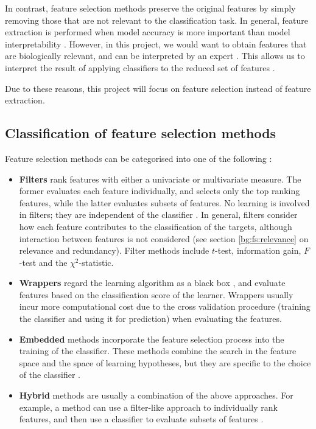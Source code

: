 \documentclass[12pt, twoside, a4paper]{report}
\begin{document}
In contrast, feature selection methods preserve the original features by simply removing those that are not relevant to the classification task. In general, feature extraction is performed when model accuracy is more important than model interpretability \cite{RefWorks:163}. However, in this project, we would want to obtain features that are biologically relevant, and can be interpreted by an expert \cite{RefWorks:192}. This allows us to interpret the result of applying classifiers to the reduced set of features \cite{RefWorks:142}.

Due to these reasons, this project will focus on feature selection instead of feature extraction.

\subsection{Classification of feature selection methods} \label{bg:fs:classification}

Feature selection methods can be categorised into one of the following \cite{RefWorks:117, RefWorks:118}:

\begin{itemize}
\item \textbf{Filters} rank features with either a univariate or multivariate measure. The former evaluates each feature individually, and selects only the top ranking features, while the latter evaluates subsets of features. No learning is involved in filters; they are independent of the classifier \cite{RefWorks:216}. In general, filters consider how each feature contributes to the classification of the targets, although interaction between features is not considered \cite{RefWorks:232} (see section \ref{bg:fs:relevance} on relevance and redundancy). Filter methods include $t$-test, information gain, $F$-test and the $\chi^2$-statistic.

\item \textbf{Wrappers} regard the learning algorithm as a black box \cite{RefWorks:140}, and evaluate features based on the classification score of the learner. Wrappers usually incur more computational cost due to the cross validation procedure (training the classifier and using it for prediction) when evaluating the features.

\item \textbf{Embedded} methods incorporate the feature selection process into the training of the classifier. These methods combine the search in the feature space and the space of learning hypotheses, but they are specific to the choice of the classifier \cite{RefWorks:118}.

\item \textbf{Hybrid} methods are usually a combination of the above approaches. For example, a method can use a filter-like approach to individually rank features, and then use a classifier to evaluate subsets of features \cite{RefWorks:140}.

\end{itemize}
\end{document}
